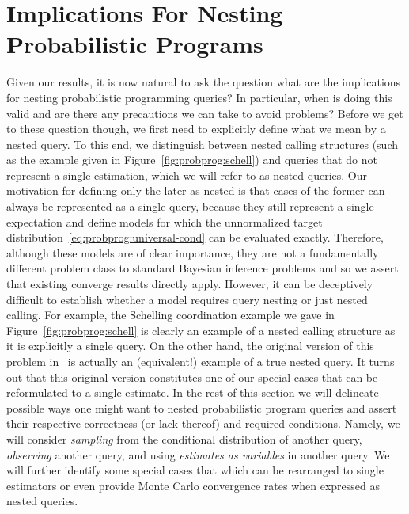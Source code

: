 
\section{Implications For Nesting Probabilistic Programs}
\label{sec:nest:imp}

Given our results, it is now natural to ask the question what are the implications
for nesting probabilistic programming queries?  In particular, when is doing
this valid and are there any precautions we can take to avoid problems?  Before
we get to these question though, we first need to explicitly define what we
mean by a nested query.  To this end, we distinguish between nested calling
structures (such as the example given in Figure~\ref{fig:probprog:schell}) and
queries that do not represent a single estimation, which we will refer
to as nested queries. Our motivation for defining only the later
as nested is that cases of the former can always be represented as a single
query, because they still represent a single expectation and define models
for which the unnormalized target distribution~\eqref{eq:probprog:universal-cond}
 can be evaluated exactly.  Therefore, although these models are
of clear importance, they are not a fundamentally different problem class
to standard Bayesian inference problems and so we assert that existing \mc
converge results directly apply.  However, it can be deceptively difficult to establish
whether a model requires query nesting or just nested calling.
For example, the Schelling coordination example we gave in Figure~\ref{fig:probprog:schell}
is clearly an example of a nested calling structure as it is explicitly a single query.
On the other hand, the original version of this problem in~\cite[Figure 6]{stuhlmuller2014reasoning}
is actually an (equivalent!) example of a true nested query.  It turns out that this original
version constitutes one of our special cases that can be reformulated to a single estimate.
In the rest of this section we will delineate possible ways one might want
to nested probabilistic program queries and
assert their respective correctness (or lack thereof) and required conditions.
Namely, we will consider \emph{sampling} from the conditional distribution
of another query, \emph{observing} another query, and using \emph{estimates as variables}
in another query.  We will further identify some special cases that which can be rearranged to single estimators or even provide Monte 
Carlo convergence rates when expressed as nested queries.

